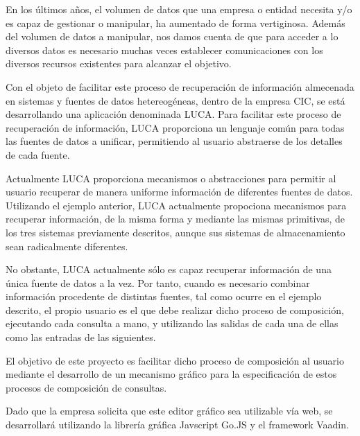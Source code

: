 \documentclass[a4paper,12pt]{article}
\begin{document}
	En los últimos años, el volumen de datos que una empresa o entidad necesita y/o es capaz de gestionar o manipular, ha aumentado de forma vertiginosa. Además del volumen de datos a manipular, nos damos cuenta de que para acceder a lo diversos datos es necesario muchas veces establecer comunicaciones con los diversos recursos existentes para alcanzar el objetivo.
	
	\vspace{5mm}
	
	
	 Con el objeto de facilitar este proceso de recuperación de información almecenada en sistemas y fuentes de datos hetereogéneas, dentro de la empresa	CIC, se está desarrollando una aplicación denominada LUCA. Para	facilitar este proceso de recuperación de información, LUCA proporciona un lenguaje común para todas las fuentes de datos a unificar, permitiendo al
	usuario abstraerse de los detalles de cada fuente.
	
	\vspace{5mm}
	
	 Actualmente LUCA proporciona mecanismos o abstracciones para permitir al	usuario recuperar de manera uniforme información de diferentes fuentes de datos.	Utilizando el ejemplo anterior, LUCA actualmente propociona mecanismos para
	recuperar información, de la misma forma y mediante las mismas primitivas, de los tres sistemas previamente descritos, aunque sus sistemas de almacenamiento sean radicalmente diferentes.
	
	\vspace{5mm}
	
	 No obstante, LUCA actualmente sólo es capaz recuperar información de una única fuente de datos a la vez. Por tanto, cuando es necesario combinar información procedente de distintas fuentes, tal como ocurre en el ejemplo descrito, el propio usuario es el que debe realizar dicho	proceso de composición, ejecutando cada consulta a mano, y utilizando las salidas de cada una de ellas como las entradas de las siguientes.
	 
	 \vspace{5mm}
	 
	 El objetivo de este proyecto es facilitar dicho proceso de composición al usuario mediante el desarrollo de un mecanismo gráfico para la especificación de estos procesos de composición de consultas.
	 
	 \vspace{5mm}
	 
	 Dado que la empresa solicita que este editor gráfico sea utilizable vía web, se desarrollará utilizando la librería gráfica Javscript Go.JS y el framework Vaadin.
	 
\end{document}
